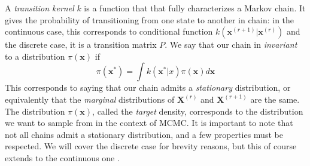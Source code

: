 \documentclass[12pt]{memoir}
\newcommand{\mb}{\mathbf}
\newcommand{\ti}{\textit}
\begin{document}
A \ti{transition kernel} $k$ is a function that that fully characterizes a Markov chain. It gives the probability of transitioning from one state to another in chain: in the continuous case, this corresponds to conditional function $k(\mb x^{(r+1)}| \mb x^{(r)})$ and the discrete case, it is a transition matrix $P$. We say that our chain in \ti{invariant} to a distribution $\pi(\mb x)$ if 
\begin{equation}
    \pi(\mb x^*) = \int k(\mb x^*|x) \pi(\mb x)d\mb x
\end{equation}
This corresponds to saying that our chain admits a \ti{stationary} distribution, or equivalently that the \ti{marginal} distributions of $\mb X^{(r)}$ and $\mb X^{(r+1)}$ are the same. The distribution $\pi(\mb x)$, called the \ti{target} density, corresponds to the distribution we want to sample from in the context of MCMC. It is important to note that not all chains admit a stationary distribution, and a few properties must be respected. We will cover the discrete case for brevity reasons, but this of course extends to the continuous one \cite{mcmc:slides:Rigon2024Mar,wiki:markov-chain}.
\end{document}
